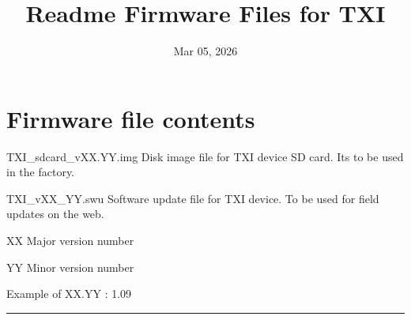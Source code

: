 \documentclass[letterpaper,10pt,english]{sphinxhowto}
\title{Readme Firmware Files for TXI}
\date{Mar 05, 2026}
\author{}
\begin{document}
\pagestyle{empty}

\pagestyle{plain}

\pagestyle{normal}
\label{\detokenize{index::doc}}


\sphinxstepscope


\section{Firmware file contents}
\label{\detokenize{topics/readme_fwf:firmware-file-contents}}\label{\detokenize{topics/readme_fwf::doc}}
\sphinxAtStartPar
TXI\_sdcard\_vXX.YY.img \sphinxhyphen{} Disk image file for TXI device SD card. Its to be used in the factory.

\sphinxAtStartPar
TXI\_vXX\_YY.swu \sphinxhyphen{} Software update file for TXI device. To be used for field updates on the web.

\sphinxAtStartPar
XX \sphinxhyphen{} Major version number

\sphinxAtStartPar
YY \sphinxhyphen{} Minor version number

\sphinxAtStartPar
Example of XX.YY : 1.09


\bigskip\hrule\bigskip




\renewcommand{\indexname}{Index}
\printindex
\end{document}
